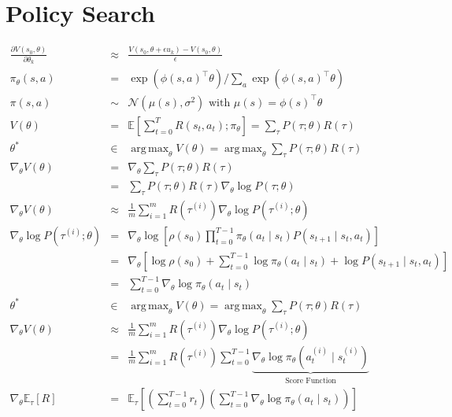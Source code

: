 \documentclass[]{article}
\DeclareMathOperator*{\argmax}{arg\,max}
\begin{document}
\section{Policy Search}

\begin{eqnarray}
    \frac{\partial V(s_0, \theta)}{\partial \theta_k} &\approx& \frac{V(s_0, \theta + \epsilon u_k) - V(s_0, \theta)}{\epsilon}\\
    \pi_\theta (s,a) &=& \exp(\phi(s,a)^\intercal\theta) / \sum_{a} \exp(\phi(s,a)^\intercal\theta)\\
    \pi(s,a) &\sim& \mathcal{N}(\mu(s), \sigma^2) \text{ with }\mu(s) = \phi(s)^\intercal \theta\\
    V(\theta) &=& \mathbb{E}\left[\sum_{t=0}^T R(s_t, a_t); \pi_\theta \right] = \sum_{\tau} P(\tau; \theta)R(\tau) \\
    \theta^* &\in& \argmax_{\theta} V(\theta) = \argmax_{\theta}\sum_{\tau} P(\tau; \theta) R(\tau)\\
    \nabla_\theta V(\theta) &=& \nabla_\theta \sum_{\tau} P(\tau; \theta)R(\tau)\\
    &=& \sum_{\tau} P(\tau; \theta)  R(\tau) \nabla_\theta \log P(\tau; \theta)\\
    \nabla_\theta V(\theta) &\approx& \frac{1}{m} \sum_{i=1}^{m} R(\tau^{(i)}) \nabla_\theta \log P(\tau^{(i)}; \theta)\\
    \nabla_\theta \log P(\tau^{(i)}; \theta) &=& \nabla_\theta \log \left[ \rho(s_0) \prod_{t=0}^{T-1} \pi_\theta(a_t \mid s_t) P(s_{t+1} \mid s_t, a_t) \right]\\
    &=& \nabla_\theta \left[ \log \rho(s_0) + \sum_{t=0}^{T-1} \log \pi_\theta(a_t \mid s_t) + \log P(s_{t+1}\mid s_t, a_t) \right]\\
    &=& \sum_{t=0}^{T-1} \nabla_\theta \log \pi_\theta (a_t \mid s_t)\\
    \theta^* &\in& \argmax_{\theta} V(\theta) = \argmax_{\theta}\sum_{\tau} P(\tau; \theta) R(\tau)\\
    \nabla_\theta V(\theta) &\approx& \frac{1}{m} \sum_{i=1}^{m} R(\tau^{(i)}) \nabla_\theta \log P(\tau^{(i)}; \theta)\\
    &=& \frac{1}{m} \sum_{i=1}^{m} R(\tau^{(i)}) \sum_{t=0}^{T-1} \underbrace{\nabla_\theta \log \pi_\theta (a_t^{(i)} \mid s_t^{(i)})}_{\text{Score Function}}\\
    \nabla_\theta \mathbb{E}_\tau [R] &=& \mathbb{E}_\tau \left[ \left(\sum_{t=0}^{T-1} r_t\right) \left( \sum_{t=0}^{T-1} \nabla_\theta \log \pi_\theta(a_t \mid s_t) \right) \right]\\

\end{eqnarray}
\end{document}
